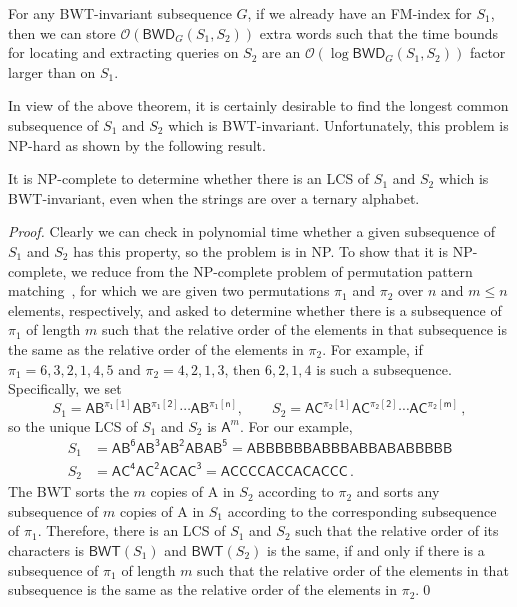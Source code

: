 \documentclass{llncs}
\newcommand{\Oh}[1]
  {\ensuremath{\mathcal{O}\!\left( {#1} \right)}}
\newcommand{\BWD}
  {\ensuremath{\mathsf{BWD}}}
\newcommand{\BWT}
  {\ensuremath{\mathsf{BWT}}}
\begin{document}
\begin{theorem} \label{theo:locating}
For any BWT-invariant subsequence $G$, if we already have an FM-index for
$S_1$, then we can store $\Oh{\BWD_G (S_1, S_2)}$ extra words such that the
time bounds for locating and extracting queries on $S_2$ are an $\Oh{\log
\BWD_G (S_1, S_2)}$ factor larger than on $S_1$.
\end{theorem}


In view of the above theorem, it is certainly desirable to find the longest
common subsequence of $S_1$ and $S_2$ which is BWT-invariant. Unfortunately,
this problem is NP-hard as shown by the following result.


\begin{theorem}\label{theo:np}
It is NP-complete to determine whether there is an LCS of $S_1$ and $S_2$
which is BWT-invariant, even when the strings are over a ternary alphabet.
\end{theorem}


\begin{proof}
Clearly we can check in polynomial time whether a given subsequence of $S_1$
and $S_2$ has this property, so the problem is in NP.  To show that it is
NP-complete, we reduce from the NP-complete problem of permutation pattern
matching~\cite{BBL98}, for which we are given two permutations $\pi_1$ and
$\pi_2$ over $n$ and \(m \leq n\) elements, respectively, and asked to
determine whether there is a subsequence of $\pi_1$ of length $m$ such that
the relative order of the elements in that subsequence is the same as the
relative order of the elements in $\pi_2$.  For example, if \(\pi_1 = 6, 3,
2, 1, 4, 5\) and \(\pi_2 = 4, 2, 1, 3\), then \(6, 2, 1, 4\) is such a
subsequence. Specifically, we set
$$
S_1 = \mathsf{A B^{\pi_1 [1]} A B^{\pi_1 [2]} \cdots A B^{\pi_1 [n]}},\quad\quad
S_2 = \mathsf{A C^{\pi_2 [1]} A C^{\pi_2 [2]} \cdots A C^{\pi_2 [m]}}\,,
$$
so the unique LCS of $S_1$ and $S_2$ is $\mathsf{A}^m$.  For our example,
\begin{align*}
S_1 & = \mathsf{A B^6 A B^3 A B^2 A B A B^5} = \mathsf{A B B B B B B A B B B A B B A B A B B B B B}\\
S_2 & = \mathsf{A C^4 A C^2 A C A C^3} = \mathsf{A C C C C A C C A C A C C C}\,.
\end{align*}
The BWT sorts the $m$ copies of {\sf A} in $S_2$ according to $\pi_2$ and
sorts any subsequence of $m$ copies of {\sf A} in $S_1$ according to the
corresponding subsequence of $\pi_1$.  Therefore, there is an LCS of $S_1$
and $S_2$ such that the relative order of its characters is \(\BWT (S_1)\)
and \(\BWT (S_2)\) is the same, if and only if there is a subsequence of
$\pi_1$ of length $m$ such that the relative order of the elements in that
subsequence is the same as the relative order of the elements in $\pi_2$.\qed
\end{proof}
\end{document}
